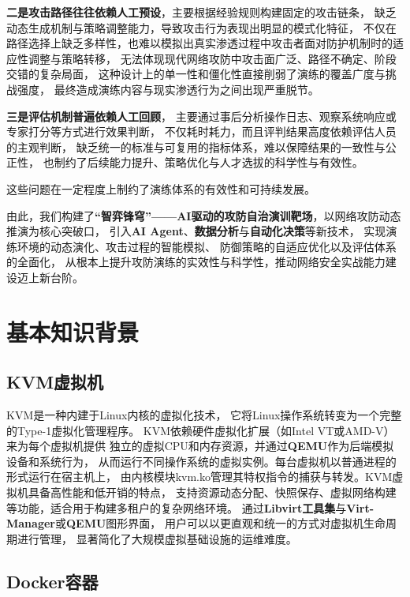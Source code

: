 \documentclass[lang=cn,10pt]{elegantbook}
\begin{document}
\textbf{二是攻击路径往往依赖人工预设}，主要根据经验规则构建固定的攻击链条，
缺乏动态生成机制与策略调整能力，导致攻击行为表现出明显的模式化特征，
不仅在路径选择上缺乏多样性，也难以模拟出真实渗透过程中攻击者面对防护机制时的适应性调整与策略转移，
无法体现现代网络攻防中攻击面广泛、路径不确定、阶段交错的复杂局面，
这种设计上的单一性和僵化性直接削弱了演练的覆盖广度与挑战强度，
最终造成演练内容与现实渗透行为之间出现严重脱节。

\textbf{三是评估机制普遍依赖人工回顾}，
主要通过事后分析操作日志、观察系统响应或专家打分等方式进行效果判断，
不仅耗时耗力，而且评判结果高度依赖评估人员的主观判断，
缺乏统一的标准与可复用的指标体系，难以保障结果的一致性与公正性，
也制约了后续能力提升、策略优化与人才选拔的科学性与有效性。

这些问题在一定程度上制约了演练体系的有效性和可持续发展。

由此，我们构建了\textbf{“智弈锋穹”——AI驱动的攻防自治演训靶场}，以网络攻防动态推演为核心突破口，
引入\textbf{AI Agent}、\textbf{数据分析}与\textbf{自动化决策}等新技术，
实现演练环境的动态演化、攻击过程的智能模拟、
防御策略的自适应优化以及评估体系的全面化，
从根本上提升攻防演练的实效性与科学性，推动网络安全实战能力建设迈上新台阶。

\section{基本知识背景}

\subsection{KVM虚拟机}

KVM是一种内建于Linux内核的虚拟化技术，
它将Linux操作系统转变为一个完整的Type-1虚拟化管理程序。
KVM依赖硬件虚拟化扩展（如Intel VT或AMD-V）来为每个虚拟机提供
独立的虚拟CPU和内存资源，并通过\textbf{QEMU}作为后端模拟设备和系统行为，
从而运行不同操作系统的虚拟实例。每台虚拟机以普通进程的形式运行在宿主机上，
由内核模块kvm.ko管理其特权指令的捕获与转发。KVM虚拟机具备高性能和低开销的特点，
支持资源动态分配、快照保存、虚拟网络构建等功能，适合用于构建多租户的复杂网络环境。
通过\textbf{Libvirt工具集}与\textbf{Virt-Manager}或\textbf{QEMU}图形界面，
用户可以以更直观和统一的方式对虚拟机生命周期进行管理，
显著简化了大规模虚拟基础设施的运维难度。

\subsection{Docker容器}
\end{document}
